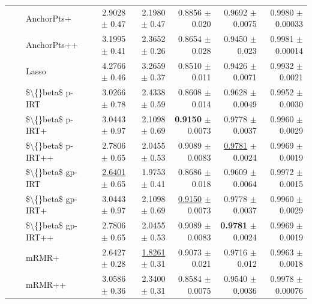\begin{longtable}{llp{}rrrrr}
 &  & AnchorPts+ & 2.9028 {\scriptsize $\pm$ 0.47} & 2.1980 {\scriptsize $\pm$ 0.47} & 0.8856 {\scriptsize $\pm$ 0.020} & 0.9692 {\scriptsize $\pm$ 0.0075} & 0.9980 {\scriptsize $\pm$ 0.00033} \\
 &  & AnchorPts++ & 3.1995 {\scriptsize $\pm$ 0.41} & 2.3652 {\scriptsize $\pm$ 0.26} & 0.8654 {\scriptsize $\pm$ 0.028} & 0.9450 {\scriptsize $\pm$ 0.023} & 0.9981 {\scriptsize $\pm$ 0.00014} \\
 &  & Lasso & 4.2766 {\scriptsize $\pm$ 0.46} & 3.2659 {\scriptsize $\pm$ 0.37} & 0.8510 {\scriptsize $\pm$ 0.011} & 0.9426 {\scriptsize $\pm$ 0.0071} & 0.9932 {\scriptsize $\pm$ 0.0021} \\
 &  & \$\textbackslash\{\}beta\$ p-IRT & 3.0266 {\scriptsize $\pm$ 0.78} & 2.4338 {\scriptsize $\pm$ 0.59} & 0.8608 {\scriptsize $\pm$ 0.014} & 0.9628 {\scriptsize $\pm$ 0.0049} & 0.9952 {\scriptsize $\pm$ 0.0030} \\
 &  & \$\textbackslash\{\}beta\$ p-IRT+ & 3.0443 {\scriptsize $\pm$ 0.97} & 2.1098 {\scriptsize $\pm$ 0.69} & \textbf{0.9150} {\scriptsize $\pm$ 0.0073} & 0.9778 {\scriptsize $\pm$ 0.0037} & 0.9960 {\scriptsize $\pm$ 0.0029} \\
 &  & \$\textbackslash\{\}beta\$ p-IRT++ & 2.7806 {\scriptsize $\pm$ 0.65} & 2.0455 {\scriptsize $\pm$ 0.53} & 0.9089 {\scriptsize $\pm$ 0.0083} & \underline{0.9781} {\scriptsize $\pm$ 0.0024} & 0.9969 {\scriptsize $\pm$ 0.0019} \\
 &  & \$\textbackslash\{\}beta\$ gp-IRT & \underline{2.6401} {\scriptsize $\pm$ 0.65} & 1.9753 {\scriptsize $\pm$ 0.41} & 0.8686 {\scriptsize $\pm$ 0.018} & 0.9609 {\scriptsize $\pm$ 0.0064} & 0.9972 {\scriptsize $\pm$ 0.0015} \\
 &  & \$\textbackslash\{\}beta\$ gp-IRT+ & 3.0443 {\scriptsize $\pm$ 0.97} & 2.1098 {\scriptsize $\pm$ 0.69} & \underline{0.9150} {\scriptsize $\pm$ 0.0073} & 0.9778 {\scriptsize $\pm$ 0.0037} & 0.9960 {\scriptsize $\pm$ 0.0029} \\
 &  & \$\textbackslash\{\}beta\$ gp-IRT++ & 2.7806 {\scriptsize $\pm$ 0.65} & 2.0455 {\scriptsize $\pm$ 0.53} & 0.9089 {\scriptsize $\pm$ 0.0083} & \textbf{0.9781} {\scriptsize $\pm$ 0.0024} & 0.9969 {\scriptsize $\pm$ 0.0019} \\
 &  & mRMR+ & 2.6427 {\scriptsize $\pm$ 0.28} & \underline{1.8261} {\scriptsize $\pm$ 0.31} & 0.9073 {\scriptsize $\pm$ 0.021} & 0.9716 {\scriptsize $\pm$ 0.012} & 0.9963 {\scriptsize $\pm$ 0.0018} \\
 &  & mRMR++ & 3.0586 {\scriptsize $\pm$ 0.36} & 2.3400 {\scriptsize $\pm$ 0.31} & 0.8584 {\scriptsize $\pm$ 0.0075} & 0.9540 {\scriptsize $\pm$ 0.0036} & 0.9978 {\scriptsize $\pm$ 0.00076} \\

\end{longtable}
